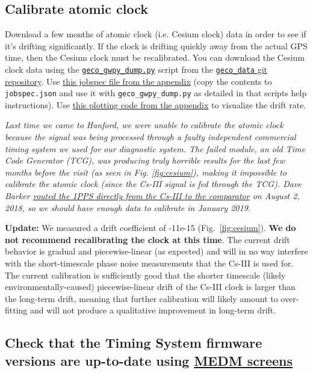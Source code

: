 \documentclass{article}
\begin{document}
\subsection{Calibrate atomic clock}

Download a few months of atomic clock (i.e. Cesium clock) data in order to see if it's drifting significantly. If the clock is drifting quickly away from the actual GPS time, then the Cesium clock must be recalibrated. You can download the Cesium clock data using the \href{https://github.com/stefco/geco_data/blob/master/geco_gwpy_dump.py}{\texttt{geco\_gwpy\_dump.py}} script from the \href{https://github.com/stefco/geco_data}{\texttt{geco\_data} git repository}. Use
\hyperref[sec:jobspec]{this jobspec file from the appendix} (copy the contents to \texttt{jobspec.json} and use it with \texttt{geco\_gwpy\_dump.py} as detailed in that scripts help instructions).
Use \hyperref[sec:plottingcode]{this plotting code from the appendix} to visualize the drift rate.

\textit{Last time we came to Hanford, we were unable to calibrate the atomic clock because the signal was being processed through a faulty independent commercial timing system we used for our diagnostic system. The failed module, an old \textit{Time Code Generator} (TCG), was producing truly horrible results for the last few months before the visit (as seen in Fig. \ref{fig:cesium}), making it impossible to calibrate the atomic clock (since the Cs-III signal is fed through the TCG). Dave Barker \href{https://alog.ligo-wa.caltech.edu/aLOG/index.php?callRep=43200}{routed the 1PPS directly from the Cs-III to the comparator} on August 2, 2018, so we should have enough data to calibrate in January 2019.}

\textbf{Update:} We measured a drift coefficient of -11e-15 (Fig.~\ref{fig:cesium}). \textbf{We do not recommend recalibrating the clock at this time}. The current drift behavior is gradual and piecewise-linear (as expected) and will in no way interfere with the short-timescale phase noise measurements that the Cs-III is used for. The current calibration is sufficiently good that the shorter timescale (likely environmentally-caused) piecewise-linear drift of the Cs-III clock is larger than the long-term drift, meaning that further calibration will likely amount to over-fitting and will not produce a qualitative improvement in long-term drift. 

\subsection{Check that the Timing System firmware versions are up-to-date using 
\href{https://wiki.ligo.org/RemoteAccess/RemoteEPICS}{MEDM screens}}
\end{document}
